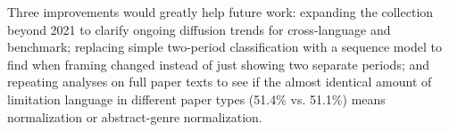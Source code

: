 Three improvements would greatly help future work: expanding the collection beyond 2021 to clarify ongoing diffusion trends for cross-language and benchmark; replacing simple two-period classification with a sequence model to find when framing changed instead of just showing two separate periods; and repeating analyses on full paper texts to see if the almost identical amount of limitation language in different paper types (51.4\% vs. 51.1\%) means normalization or abstract-genre normalization.